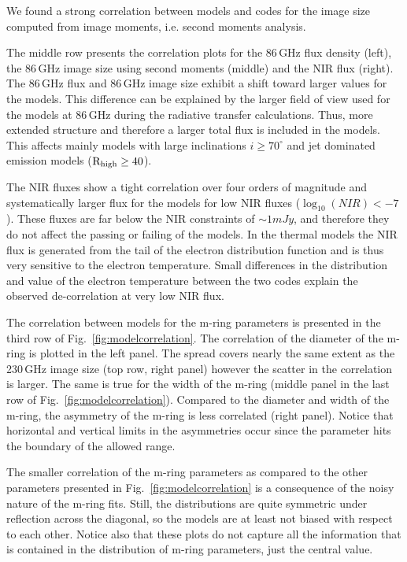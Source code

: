We found a strong correlation between models and codes for the image size computed from image moments, i.e. second moments analysis.

The middle row presents the correlation plots for the 86\,GHz flux density (left), the 86\,GHz image size using second moments (middle) and the NIR flux (right). The 86\,GHz flux and 86\,GHz image size exhibit a shift toward larger values for the \bhac models. This difference can be explained by the larger field of view used for the \bhac models at 86\,GHz during the radiative transfer calculations. Thus, more extended structure and therefore a larger total flux is included in the \bhac models. This affects mainly models with large inclinations $i\geq70^\circ$ and jet dominated emission models ($\rm{R}_{\rm high}\geq 40$).

The NIR fluxes show a tight correlation over four orders of magnitude and systematically larger flux for the \bhac models for low NIR fluxes ($\log_{10}(NIR)<-7$). These fluxes are far below the NIR constraints of $\sim 1mJy$, and therefore they do not affect the passing or failing of the models. In the thermal models the NIR flux is generated from the tail of the electron distribution function and is thus very sensitive to the electron temperature. Small differences in the distribution and value of the electron temperature between the two codes explain the observed de-correlation at very low NIR flux. 

The correlation between models for the m-ring parameters is presented in the third row of Fig.~\ref{fig:modelcorrelation}. The correlation of the diameter of the m-ring is plotted in the left panel. The spread covers nearly the same extent as the 230\,GHz image size (top row, right panel) however the scatter in the correlation is larger.  The same is true for the width of the m-ring (middle panel in the last row of Fig.~\ref{fig:modelcorrelation}). Compared to the diameter and width of the m-ring, the asymmetry of the m-ring is less correlated (right panel). Notice that horizontal and vertical limits in the asymmetries occur since the parameter hits the boundary of the allowed range.

The smaller correlation of the m-ring parameters as compared to the other parameters presented in Fig.~\ref{fig:modelcorrelation} is a consequence of the noisy nature of the m-ring fits.  Still, the distributions are quite symmetric under reflection across the diagonal, so the models are at least not biased with respect to each other.  Notice also that these plots do not capture all the information that is contained in the distribution of m-ring parameters, just the central value.   

